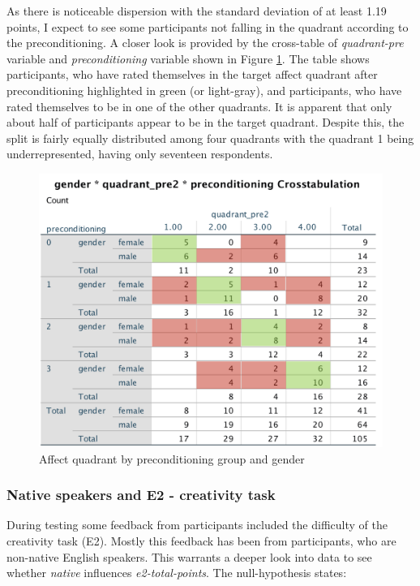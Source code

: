 		 As there is noticeable dispersion with the standard deviation of at least 1.19 points, I expect to see some participants not falling in the quadrant according to the preconditioning. A closer look is provided by the cross-table of \textit{quadrant-pre} variable and \textit{preconditioning} variable shown in Figure \ref{fig:preconditioningsuccessbygender}. The table shows participants, who have rated themselves in the target affect quadrant after preconditioning highlighted in green (or light-gray), and participants, who have rated themselves to be in one of the other quadrants. It is apparent that only about half of participants appear to be in the target quadrant. Despite this, the split is fairly equally distributed among four quadrants with the quadrant 1 being underrepresented, having only seventeen respondents.
		
\begin{figure}[h!]
	\centering
	\includegraphics[width=0.7\linewidth]{graphics/preconditioning_success_by_gender}
	\caption{Affect quadrant by preconditioning group and gender}
	\label{fig:preconditioningsuccessbygender}
\end{figure}

		\subsubsection{Native speakers and E2 - creativity task} \label{sec:data-validity-native}
		
		During testing some feedback from participants included the difficulty of the creativity task (E2). Mostly this feedback has been from participants, who are non-native English speakers. This warrants a deeper look into data to see whether \textit{native} influences \textit{e2-total-points}. The null-hypothesis states:
		
